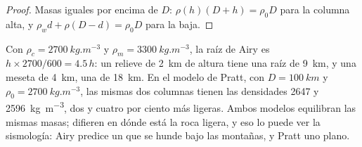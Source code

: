 \begin{proof}
Masas iguales por encima de $D$: $\rho(h)(D + h) = \rho_0 D$ para la columna alta, y $\rho_w d + \rho(D - d) = \rho_0 D$ para la baja.
\end{proof}

Con $\rho_c = \qty{2700}{kg.m^{-3}}$ y $\rho_m = \qty{3300}{kg.m^{-3}}$, la raíz de Airy es $h\times2700/600 = 4.5\,h$: un relieve
de \qty{2}{km} de altura tiene una raíz de \qty{9}{km}, y una meseta de \qty{4}{km}, una de \qty{18}{km}. En el modelo de Pratt, con
$D = \qty{100}{km}$ y $\rho_0 = \qty{2700}{kg.m^{-3}}$, las mismas dos columnas tienen las densidades 2647 y \qty{2596}{kg.m^{-3}}, dos
y cuatro por ciento más ligeras. Ambos modelos equilibran las mismas masas; difieren en dónde está la roca ligera, y eso lo puede ver
la sismología: Airy predice un  que se hunde bajo las montañas, y Pratt uno plano.

